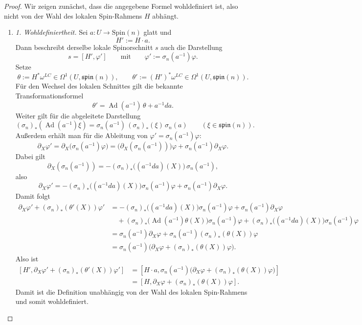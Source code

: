 \documentclass[10pt, letterpaper]{article}
\newcommand{\Ad}{\operatorname{Ad}}
\newcommand{\Spin}{\mathrm{Spin}}
\begin{document}
\begin{proof}
Wir zeigen zunächst, dass die angegebene Formel wohldefiniert ist, also nicht von der Wahl des lokalen Spin-Rahmens \(H\) abhängt.

\medskip

\begin{enumerate}
    \item \emph{1. Wohldefiniertheit.}
    Sei \(a:U\to \Spin(n)\) glatt und
    \[
    H':=H\cdot a.
    \]
    Dann beschreibt derselbe lokale Spinorschnitt \(s\) auch die Darstellung
    \[
    s=[H',\varphi']
    \qquad\text{mit}\qquad
    \varphi':=\sigma_n(a^{-1})\varphi.
    \]
    Setze
    \[
    \theta:=H^*\omega^{LC}\in \Omega^1(U,\mathfrak{spin}(n)),
    \qquad
    \theta':=(H')^*\omega^{LC}\in \Omega^1(U,\mathfrak{spin}(n)).
    \]
    Für den Wechsel des lokalen Schnittes gilt die bekannte Transformationsformel
    \[
    \theta'=\Ad(a^{-1})\,\theta+a^{-1}da.
    \]
    Weiter gilt für die abgeleitete Darstellung
    \[
    (\sigma_n)_*(\Ad(a^{-1})\xi)
    =
    \sigma_n(a^{-1})\,(\sigma_n)_*(\xi)\,\sigma_n(a)
    \qquad
    (\xi\in \mathfrak{spin}(n)).
    \]
    Außerdem erhält man für die Ableitung von \(\varphi'=\sigma_n(a^{-1})\varphi\):
    \[
    \partial_X\varphi'
    =
    \partial_X\bigl(\sigma_n(a^{-1})\varphi\bigr)
    =
    \bigl(\partial_X(\sigma_n(a^{-1}))\bigr)\varphi+\sigma_n(a^{-1})\partial_X\varphi.
    \]
    Dabei gilt
    \[
    \partial_X(\sigma_n(a^{-1}))
    =
    -(\sigma_n)_*\bigl((a^{-1}da)(X)\bigr)\,\sigma_n(a^{-1}),
    \]
    also
    \[
    \partial_X\varphi'
    =
    -(\sigma_n)_*\bigl((a^{-1}da)(X)\bigr)\sigma_n(a^{-1})\varphi
    +\sigma_n(a^{-1})\partial_X\varphi.
    \]
    Damit folgt
    \begin{align*}
    \partial_X\varphi'+(\sigma_n)_*(\theta'(X))\varphi'
    &=
    -(\sigma_n)_*\bigl((a^{-1}da)(X)\bigr)\sigma_n(a^{-1})\varphi
    +\sigma_n(a^{-1})\partial_X\varphi \\
    &\quad
    +(\sigma_n)_*\bigl(\Ad(a^{-1})\theta(X)\bigr)\sigma_n(a^{-1})\varphi
    +(\sigma_n)_*\bigl((a^{-1}da)(X)\bigr)\sigma_n(a^{-1})\varphi \\
    &=
    \sigma_n(a^{-1})\partial_X\varphi
    +\sigma_n(a^{-1})(\sigma_n)_*(\theta(X))\varphi \\
    &=
    \sigma_n(a^{-1})
    \bigl(\partial_X\varphi+(\sigma_n)_*(\theta(X))\varphi\bigr).
    \end{align*}
    Also ist
    \begin{align*}
    \left[H',\partial_X\varphi'+(\sigma_n)_*(\theta'(X))\varphi'\right]
    &=
    \left[H\cdot a,\sigma_n(a^{-1})
    \bigl(\partial_X\varphi+(\sigma_n)_*(\theta(X))\varphi\bigr)\right] \\
    &=
    \left[H,\partial_X\varphi+(\sigma_n)_*(\theta(X))\varphi\right].
    \end{align*}
    Damit ist die Definition unabhängig von der Wahl des lokalen Spin-Rahmens und somit wohldefiniert.



\end{enumerate}
\end{proof}
\end{document}
